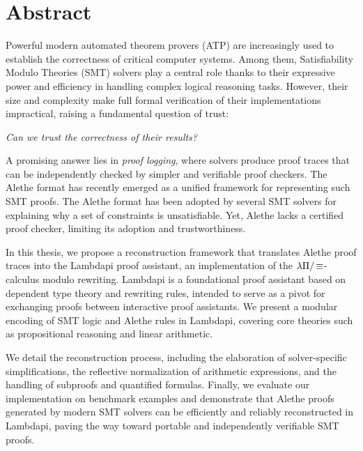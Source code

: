 \begingroup
\let\clearpage\relax
\let\cleardoublepage\relax
\let\cleardoublepage\relax

\chapter*{Abstract}
Powerful modern automated theorem provers (ATP) are increasingly used to establish the correctness of critical computer systems.
Among them, Satisfiability Modulo Theories (SMT) solvers play a central role thanks to their expressive power and efficiency in handling complex logical reasoning tasks.
However, their size and complexity make full formal verification of their implementations impractical, raising a fundamental question of trust:
\begin{center}
\emph{Can we trust the correctness of their results?}
\end{center}

A promising answer lies in \emph{proof logging}, where solvers produce proof traces that can be independently checked by simpler and verifiable proof checkers.
The Alethe format has recently emerged as a unified framework for representing such SMT proofs.
The Alethe format has been adopted by several SMT solvers for explaining why a set of constraints is unsatisfiable.
Yet, Alethe lacks a certified proof checker, limiting its adoption and trustworthiness.

In this thesis, we propose a reconstruction framework that translates Alethe proof traces into the Lambdapi proof assistant, an implementation of the $\lambda\Pi/\mathop{\equiv}$-calculus modulo rewriting.
Lambdapi is a foundational proof assistant based on dependent type theory and rewriting rules, intended to serve as a pivot for exchanging proofs between interactive proof assistants.
We present a modular encoding of SMT logic and Alethe rules in Lambdapi, covering core theories such as propositional reasoning and linear arithmetic.

We detail the reconstruction process, including the elaboration of solver-specific simplifications, the reflective normalization of arithmetic expressions, and the handling of subproofs and quantified formulas.
Finally, we evaluate our implementation on benchmark examples and demonstrate that Alethe proofs generated by modern SMT solvers can be efficiently and reliably reconstructed in Lambdapi, paving the way toward portable and independently verifiable SMT proofs.

\endgroup			

\vfill